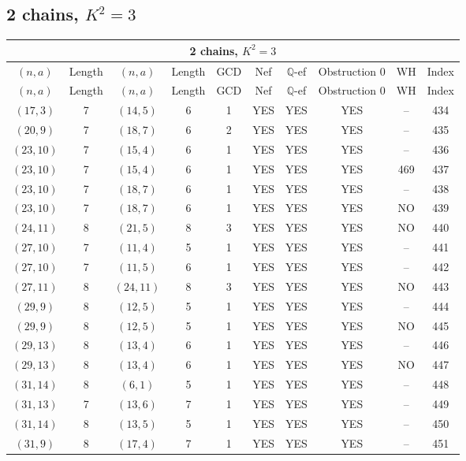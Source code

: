 \subsection{2 chains, $K^2 = 3$}
\begin{longtable}{|c|c|c|c|c|c|c|c|c|c|}
\hline
\multicolumn{10}{|c|}{2 chains, $K^2 = 3$}\\
\hline
$(n,a)$ & Length & $(n,a)$ & Length & GCD & Nef & $\mathbb Q$-ef & Obstruction 0 & WH & Index\\
\hline
\endfirsthead

\hline
$(n,a)$ & Length & $(n,a)$ & Length & GCD & Nef & $\mathbb Q$-ef & Obstruction 0 & WH & Index\\
\hline
\endhead
\hline
\endfoot

$(17, 3)$ & 7 & $(14, 5)$ & 6 & 1 & YES & YES & YES & -- & 434\\
$(20, 9)$ & 7 & $(18, 7)$ & 6 & 2 & YES & YES & YES & -- & 435\\
$(23, 10)$ & 7 & $(15, 4)$ & 6 & 1 & YES & YES & YES & -- & 436\\
$(23, 10)$ & 7 & $(15, 4)$ & 6 & 1 & YES & YES & YES & 469 & 437\\
$(23, 10)$ & 7 & $(18, 7)$ & 6 & 1 & YES & YES & YES & -- & 438\\
$(23, 10)$ & 7 & $(18, 7)$ & 6 & 1 & YES & YES & YES & NO & 439\\
$(24, 11)$ & 8 & $(21, 5)$ & 8 & 3 & YES & YES & YES & NO & 440\\
$(27, 10)$ & 7 & $(11, 4)$ & 5 & 1 & YES & YES & YES & -- & 441\\
$(27, 10)$ & 7 & $(11, 5)$ & 6 & 1 & YES & YES & YES & -- & 442\\
$(27, 11)$ & 8 & $(24, 11)$ & 8 & 3 & YES & YES & YES & NO & 443\\
$(29, 9)$ & 8 & $(12, 5)$ & 5 & 1 & YES & YES & YES & -- & 444\\
$(29, 9)$ & 8 & $(12, 5)$ & 5 & 1 & YES & YES & YES & NO & 445\\
$(29, 13)$ & 8 & $(13, 4)$ & 6 & 1 & YES & YES & YES & -- & 446\\
$(29, 13)$ & 8 & $(13, 4)$ & 6 & 1 & YES & YES & YES & NO & 447\\
$(31, 14)$ & 8 & $(6, 1)$ & 5 & 1 & YES & YES & YES & -- & 448\\
$(31, 13)$ & 7 & $(13, 6)$ & 7 & 1 & YES & YES & YES & -- & 449\\
$(31, 14)$ & 8 & $(13, 5)$ & 5 & 1 & YES & YES & YES & -- & 450\\
$(31, 9)$ & 8 & $(17, 4)$ & 7 & 1 & YES & YES & YES & -- & 451\\

\end{longtable}
